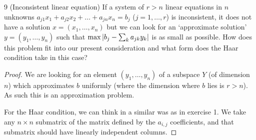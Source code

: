 \begin{exercise}{9 (Inconsistent linear equation)}
If a system of $r > n$ linear equations in $n$ unknowns $a_{j 1} x_1 + a_{j 2} x_2 + \dots + a_{j n} x_n = b_j$ ($j = 1, \dots, r$) is inconsistent, it does not have a solution $x = (x_1, \dots, x_n)$ but we can look for an `approximate solution' $y = (y_1, \dots, y_n)$ such that $\max \left\lvert b_j - \sum_k a_{j k} y_k\right\rvert$ is as small as possible.
How does this problem fit into our present consideration and what form does the Haar condition take in this case?
\end{exercise}
\begin{proof}
We are looking for an element $(y_1, \dots, y_n)$ of a subspace $Y$ (of dimension $n$) which approximates $b$ uniformly (where the dimension where $b$ lies is $r > n$).
As such this is an approximation problem.

For the Haar condition, we can think in a similar was as in exercise 1.
We take any $n \times n$ submatrix of the matrix defined by the $a_{i,j}$ coefficients, and that submatrix should have linearly independent columns.
\end{proof} 

